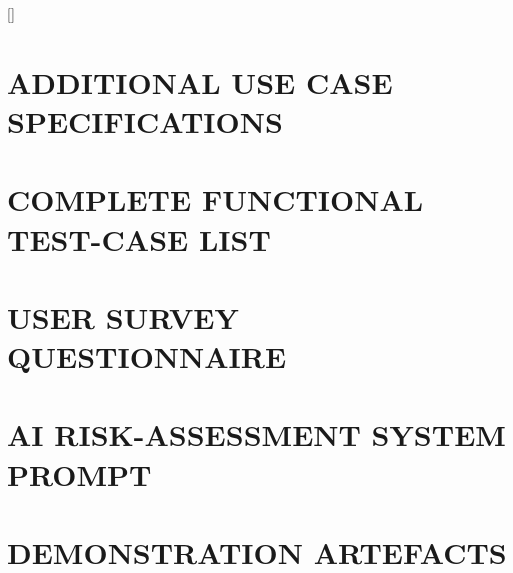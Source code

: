 \documentclass[a4paper,13pt,3p,twoside]{report}
\theoremstyle{definition}
\begin{document}
\newpage
[]
\begin{appendices}

\chapter{ADDITIONAL USE CASE SPECIFICATIONS}
\label{appendix:usecases}


\newpage
\chapter{COMPLETE FUNCTIONAL TEST-CASE LIST}
\label{appendix:testcases}


\newpage
\chapter{USER SURVEY QUESTIONNAIRE}
\label{appendix:survey}


\newpage
\chapter{AI RISK-ASSESSMENT SYSTEM PROMPT}
\label{appendix:ai_prompt}


\newpage
\chapter{DEMONSTRATION ARTEFACTS}
\label{appendix:demo}


\end{appendices}
\end{document}

